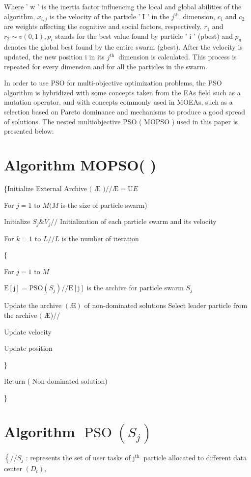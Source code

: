 \documentclass[10pt]{article}
\begin{document}
Where ' $\mathrm{w}$ ' is the inertia factor influencing the local and global abilities of the algorithm, $x_{i, j}$ is the velocity of the particle ' $\mathrm{I}$ ' in the $j^{\text {th }}$ dimension, $c_{1}$ and $c_{2}$ are weights affecting the cognitive and social factors, respectively. $r_{1}$ and $r_{2} \sim v(0,1), p_{i}$ stands for the best value found by particle ' $\mathrm{i}$ ' (pbest) and $p_{g}$ denotes the global best found by the entire swarm (gbest). After the velocity is updated, the new position $\mathrm{i}$ in its $j^{\text {th }}$ dimension is calculated. This process is repeated for every dimension and for all the particles in the swarm.

In order to use PSO for multi-objective optimization problems, the PSO algorithm is hybridized with some concepts taken from the EAs field such as a mutation operator, and with concepts commonly used in MOEAs, such as a selection based on Pareto dominance and mechanisms to produce a good spread of solutions. The nested multiobjective PSO ( MOPSO ) used in this paper is presented below:

\section{Algorithm MOPSO( )}
 \{Initialize External Archive $($ Æ $) / / Æ=\mathrm{U} E$

For $j=1$ to $M(M$ is the size of particle swarm)

Initialize $S_{j} \& V_{j} / /$ Initialization of each particle swarm and its velocity

For $k=1$ to $L / / L$ is the number of iteration

\{

For $j=1$ to $M$

$\mathrm{E}[\mathrm{j}]=\mathrm{PSO}\left(S_{j}\right) / / \mathrm{E}[\mathrm{j}]$ is the archive for particle swarm $S_{j}$

Update the archive $(Æ)$ of non-dominated solutions Select leader particle from the archive $($ Æ)//

Update velocity

Update position

\}

Return ( Non-dominated solution)

\}

\section{Algorithm $\operatorname{PSO}\left(S_{j}\right)$}
$\left\{/ / S_{j}\right.$ : represents the set of user tasks of $\mathrm{j}^{\text {th }}$ particle allocated to different data center $\left(D_{t}\right)$,
\end{document}
